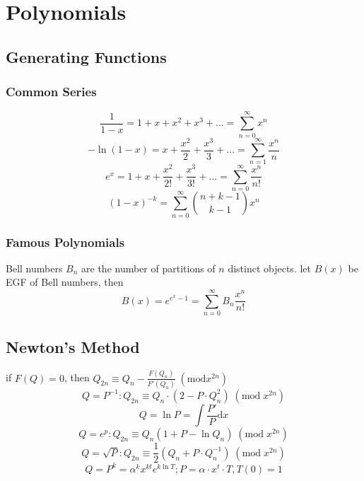 \chapter{Polynomials}

\section{Generating Functions}
\subsection{Common Series}
\[\frac{1}{1-x} = 1 + x + x^2 + x^3 + \dots = \sum_{n=0}^\infty x^n\]
\[-\ln(1-x) = x + \frac{x^2}{2} + \frac{x^3}{3} + \dots = \sum_{n=1}^\infty \frac{x^n}{n}\]
\[e^x = 1 + x + \frac{x^2}{2!} + \frac{x^3}{3!} + \dots = \sum_{n=0}^\infty \frac{x^n}{n!}\]
\[(1-x)^{-k} = \sum_{n=0}^\infty \binom{n+k-1}{k-1} x^n\]

\subsection{Famous Polynomials}
Bell numbers $B_n$ are the number of partitions of $n$ distinct objects.
let $B(x)$ be EGF of Bell numbers, then
\[B(x) = e^{e^x - 1} = \sum_{n=0}^\infty B_n \frac{x^n}{n!}\]

\section{Newton's Method}
if $F(Q) = 0$, then $Q_{2n} \equiv Q_{n} - \frac{F(Q_{n})}{F'(Q_{n})}\;(\mathrm{mod} x^{2n})$ 
\[Q = P^{-1}: Q_{2n} \equiv Q_{n} \cdot (2 - P \cdot Q_{n}^2)\;(\mathrm{mod}\; x^{2n}) \]
\[Q = \ln{P} = \int\frac{P'}{P} \mathrm{d}x \]
\[Q = e^{p}: Q_{2n} \equiv Q_{n}(1 + P - \ln{Q_n})\;(\mathrm{mod}\; x^{2n}) \]
\[Q = \sqrt{P}: Q_{2n} \equiv \frac{1}{2}(Q_{n} + P \cdot Q_{n}^{-1})\;(\mathrm{mod}\; x^{2n}) \]
\[Q = P^{k} = \alpha^{k}x^{kt}e^{k\ln{T}}; P = \alpha \cdot x^{t} \cdot T, T(0) = 1 \]

